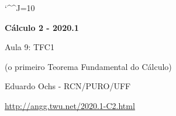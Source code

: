 \documentclass[oneside,12pt]{article}
\begin{document}
\catcode`\^^J=10

\pu

\long{}
\long{}
\long{}
\long{}
\long{}
\long{}
\long{}
\long{}
\long{}
\long{}

\long{}
\long{}

\def\frown{\ensuremath{{=}{(}}}
\def\True {\mathbf{V}}
\def\False{\mathbf{F}}

\def\drafturl{http://angg.twu.net/LATEX/2020-1-C2.pdf}
\def\drafturl{http://angg.twu.net/2020.1-C2.html}
\def\draftfooter{\tiny \href{\drafturl}{\jobname{}} \ColorBrown{\shorttoday{} \hours}}

\unitlength=10pt



%

\thispagestyle{empty}

\begin{center}

\vspace*{1.2cm}

{\bf \Large Cálculo 2 - 2020.1}

\bsk

Aula 9: TFC1

(o primeiro Teorema Fundamental do Cálculo)

\bsk

Eduardo Ochs - RCN/PURO/UFF

\url{http://angg.twu.net/2020.1-C2.html}

\end{center}
\end{document}
